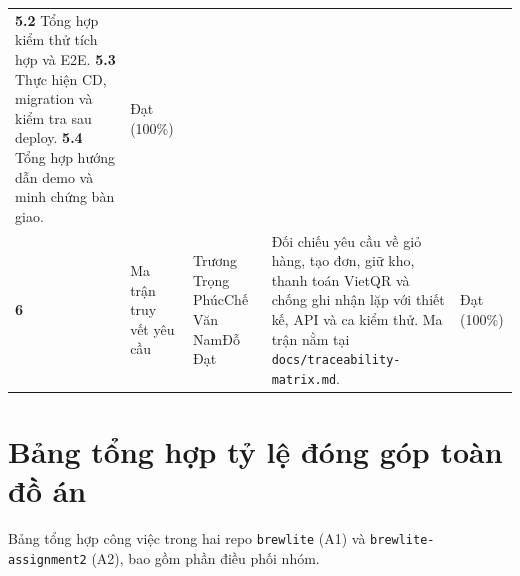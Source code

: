 \begin{longtable}{@{}l>{\raggedright\arraybackslash}p{}>{\raggedright\arraybackslash}p{}>{\raggedright\arraybackslash}p{}l@{}}
  \newline\textbf{5.2} Tổng hợp kiểm thử tích hợp và E2E.
  \newline\textbf{5.3} Thực hiện CD, migration và kiểm tra sau deploy.
  \newline\textbf{5.4} Tổng hợp hướng dẫn demo và minh chứng bàn giao.
& Đạt (100\%) \\
\addlinespace
\textbf{6} & Ma trận truy vết yêu cầu
& Trương Trọng Phúc\newline Chế Văn Nam\newline Đỗ Đạt
& Đối chiếu yêu cầu về giỏ hàng, tạo đơn, giữ kho, thanh toán VietQR và chống ghi nhận lặp với thiết kế, API và ca kiểm thử. Ma trận nằm tại \nolinkurl{docs/traceability-matrix.md}.
& Đạt (100\%) \\
\end{longtable}
\endgroup

\clearpage
{}
{}
\section*{Bảng tổng hợp tỷ lệ đóng góp toàn đồ án}

Bảng tổng hợp công việc trong hai repo \nolinkurl{brewlite} (A1) và
\nolinkurl{brewlite-assignment2} (A2), bao gồm phần điều phối nhóm.

